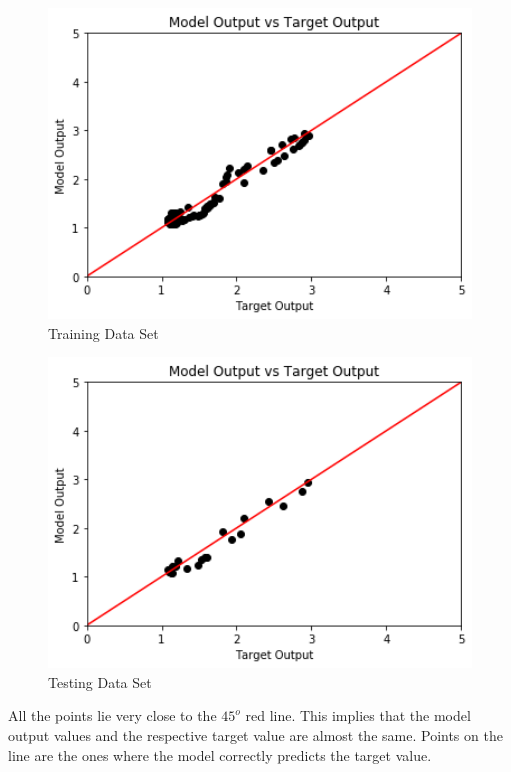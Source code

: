 \documentclass[a4 paper]{article}
\begin{document}
\begin{figure}[!htb]
    \centering
    \begin{minipage}{0.49\textwidth}
        \centering
        \includegraphics[width=1\textwidth]{T vs Y train.png} \\
         Training Data Set 
    \end{minipage}\hfill
    \begin{minipage}{0.49\textwidth}
        \centering
        \includegraphics[width=1\textwidth]{T vs Y test.png}\\
         Testing Data Set
    \end{minipage}
    \label{fig:l}
\end{figure}
All the points lie very close to the $45^{o}$ red line. This implies that the model output values and the respective target value are almost the same. Points on the line are the ones where the model correctly predicts the target value. \\
\end{document}

